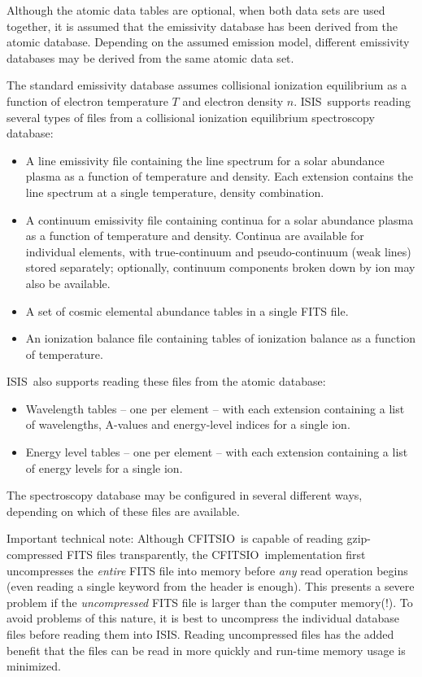 \documentclass{book}
\newcommand{\isisx}{{\sc ISIS~}}
\newcommand{\isis}{{\sc ISIS}}
\newcommand{\cfitsio}{{\sc CFITSIO}}
\begin{document}
{Although the atomic data tables are optional, when both data sets are used
together, it is assumed that the emissivity database has been derived from
the atomic database. Depending on the assumed emission model, different
emissivity databases may be derived from the same atomic data set.

The standard emissivity database assumes collisional ionization equilibrium
as a function of electron temperature $T$ and electron density $n$.
\isisx supports reading several types of files from a collisional ionization
equilibrium spectroscopy database:
\begin{itemize}
\item A line emissivity file containing the
  line spectrum for a solar abundance plasma as a function of temperature and
  density. Each extension contains the line spectrum at a single
temperature, density combination.
\item A continuum emissivity file containing continua for a solar abundance
  plasma as a function of temperature and density.
  Continua are available for individual elements, with true-continuum
  and pseudo-continuum (weak lines) stored separately;  optionally,
  continuum components broken down by ion may also be available.
\item A set of cosmic elemental abundance tables in a single FITS file.
\item An ionization balance file containing tables of ionization balance as a
      function of temperature.
\end{itemize}

\isisx also supports reading these files from the atomic database:
\begin{itemize}
\item Wavelength tables -- one per element -- with each extension containing
  a list of  wavelengths, A-values and energy-level indices for a single ion.
\item Energy level tables -- one per element -- with each extension
  containing a list of energy levels for a single ion.
\end{itemize}
The spectroscopy database may be configured in several different ways,
depending on which of these files are available.

Important technical note: Although \cfitsio\ is capable of reading
gzip-compressed FITS files transparently, the \cfitsio\ implementation first
uncompresses the {\it entire} FITS file into memory before {\it any} read
operation begins (even reading a single keyword from the header is enough).
This presents a severe problem if the {\it uncompressed} FITS file is larger
than the computer memory(!). To avoid problems of this nature, it is best to
uncompress the individual database files before reading them into
\isis. Reading uncompressed files has the added benefit that the files can
be read in more quickly and run-time memory usage is minimized.

}
\end{document}
